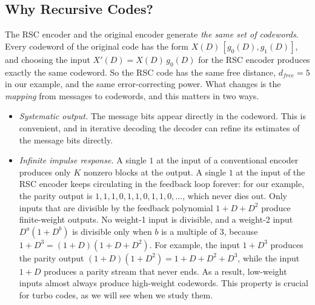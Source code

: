 \subsection{Why Recursive Codes?}
The RSC encoder and the original encoder generate \emph{the same set of codewords}. Every codeword of the original code has the form \(X(D)\,[g_0(D), g_1(D)]\), and choosing the input \(X'(D) = X(D)\, g_0(D)\) for the RSC encoder produces exactly the same codeword. So the RSC code has the same free distance, \(d_{free} = 5\) in our example, and the same error-correcting power. What changes is the \emph{mapping} from messages to codewords, and this matters in two ways.
\begin{itemize}
    \item \emph{Systematic output.} The message bits appear directly in the codeword. This is convenient, and in iterative decoding the decoder can refine its estimates of the message bits directly.
    \item \emph{Infinite impulse response.} A single \(1\) at the input of a conventional encoder produces only \(K\) nonzero blocks at the output. A single \(1\) at the input of the RSC encoder keeps circulating in the feedback loop forever: for our example, the parity output is \(1, 1, 1, 0, 1, 1, 0, 1, 1, 0, \ldots\), which never dies out. Only inputs that are divisible by the feedback polynomial \(1 + D + D^2\) produce finite-weight outputs. No weight-1 input is divisible, and a weight-2 input \(D^a(1 + D^b)\) is divisible only when \(b\) is a multiple of \(3\), because \(1 + D^3 = (1 + D)(1 + D + D^2)\). For example, the input \(1 + D^3\) produces the parity output \((1+D)(1+D^2) = 1 + D + D^2 + D^3\), while the input \(1 + D\) produces a parity stream that never ends. As a result, low-weight inputs almost always produce high-weight codewords. This property is crucial for turbo codes, as we will see when we study them.
\end{itemize}

